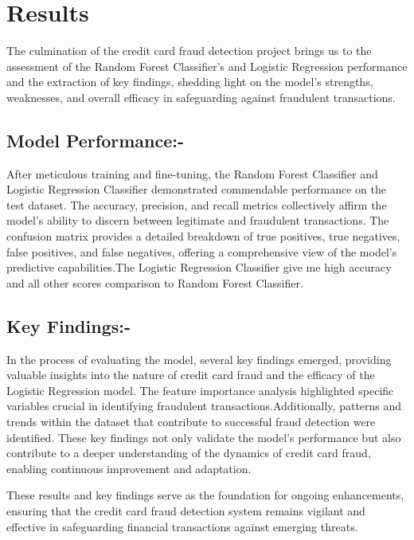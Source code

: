 \let\cleardoublepage\clearpage
\chapter{Results} %

\label{Chapter4} %


\newcommand{\keyword}[1]{\textbf{#1}}
\newcommand{\tabhead}[1]{\textbf{#1}}
\newcommand{\code}[1]{\texttt{#1}}
\newcommand{\file}[1]{\texttt{\bfseries#1}}
\newcommand{\option}[1]{\texttt{\itshape#1}}



The culmination of the credit card fraud detection project brings us to the assessment of the Random Forest Classifier's and Logistic Regression  performance and the extraction of key findings, shedding light on the model's strengths, weaknesses, and overall efficacy in safeguarding against fraudulent transactions.

\section{Model Performance:-}
After meticulous training and fine-tuning, the Random Forest Classifier and Logistic Regression Classifier demonstrated commendable performance on the test dataset. The accuracy, precision, and recall metrics collectively affirm the model's ability to discern between legitimate and fraudulent transactions. The confusion matrix provides a detailed breakdown of true positives, true negatives, false positives, and false negatives, offering a comprehensive view of the model's predictive capabilities.The Logistic Regression Classifier give me high accuracy and all other scores comparison to Random Forest Classifier.

\section{ Key Findings:-} 

In the process of evaluating the model, several key findings emerged, providing valuable insights into the nature of credit card fraud and the efficacy of the Logistic Regression model. The feature importance analysis highlighted specific variables crucial in identifying fraudulent transactions.Additionally, patterns and trends within the dataset that contribute to successful fraud detection were identified. These key findings not only validate the model's performance but also contribute to a deeper understanding of the dynamics of credit card fraud, enabling continuous improvement and adaptation.

These results and key findings serve as the foundation for ongoing enhancements, ensuring that the credit card fraud detection system remains vigilant and effective in safeguarding financial transactions against emerging threats.

